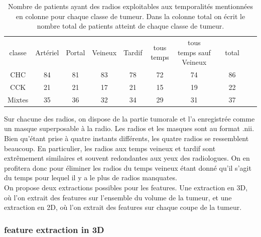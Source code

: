 \documentclass[10pt]{article}
\begin{document}
\begin{table}[tbp]
    \centering
    \caption{Nombre de patients ayant des radios exploitables aux temporalités mentionnées en colonne pour chaque classe de tumeur. Dans la colonne total on écrit le nombre total de patients atteint de chaque classe de tumeur.}
    \label{tab:nb_tumeurs}
    \begin{tabular}{|c|c|c|c|c|c|c|c|c|c|c|}
        \cline{1-7} \cline{9-9}
        classe & Artériel & Portal & Veineux & Tardif & tous temps & tous temps sauf Veineux & & total \\
        \cline{1-7} \cline{9-9}
        CHC & 84 & 81 & 83 & 78 & 72 & 74 & & 86\\
        \cline{1-7} \cline{9-9}
        CCK & 21 & 21 & 17 & 21 & 15 & 19 & & 22\\
        \cline{1-7} \cline{9-9}
        Mixtes & 35 & 36 & 32 & 34 & 29 & 31 & & 37\\
        \cline{1-7} \cline{9-9}
    \end{tabular}
\end{table}

Sur chacune des radios, on dispose de la partie tumorale et l'a enregistrée comme un masque superposable à la radio. Les radios et les masques sont au format .nii. Bien qu'étant prise à quatre instants différents, les quatre radios se ressemblent beaucoup. En particulier, les radios aux temps veineux et tardif sont extrêmement similaires et souvent redondantes aux yeux des radiologues. On en profitera donc pour éliminer les radios du temps veineux étant donné qu'il s'agit du temps pour lequel il y a le plus de radios manquates.\\
On propose deux extractions possibles pour les features. Une extraction en 3D, où l'on extrait des features sur l'ensemble du volume de la tumeur, et une extraction en 2D, où l'on extrait des features sur chaque coupe de la tumeur.\\

\subsubsection{feature extraction in 3D}
\end{document}
